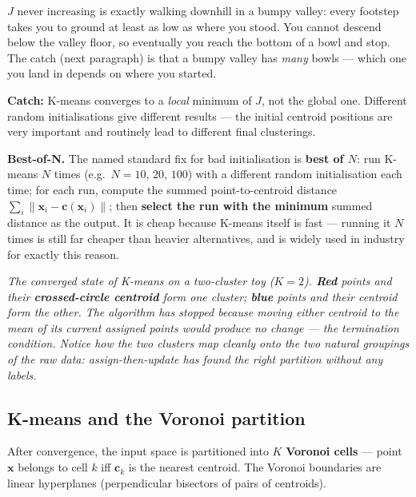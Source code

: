 \documentclass[11pt, a4paper]{article}
\begin{document}
\begin{notebox}
$J$ never increasing is exactly walking downhill in a bumpy valley: every footstep takes you to ground at least as low as where you stood. You cannot descend below the valley floor, so eventually you reach the bottom of a bowl and stop. The catch (next paragraph) is that a bumpy valley has \emph{many} bowls --- which one you land in depends on where you started.
\end{notebox}

\textbf{Catch:} K-means converges to a \emph{local} minimum of $J$, not the global one. Different random initialisations give different results — the initial centroid positions are very important and routinely lead to different final clusterings.

\textbf{Best-of-N.} The named standard fix for bad initialisation is \textbf{best of $N$}: run K-means $N$ times (e.g.\ $N = 10$, $20$, $100$) with a different random initialisation each time; for each run, compute the summed point-to-centroid distance $\sum_i \|\mathbf{x}_i - \mathbf{c}(\mathbf{x}_i)\|$; then \textbf{select the run with the minimum} summed distance as the output. It is cheap because K-means itself is fast — running it $N$ times is still far cheaper than heavier alternatives, and is widely used in industry for exactly this reason.

\begin{center}

\footnotesize\textit{The converged state of K-means on a two-cluster toy ($K=2$). \textbf{Red} points and their \textbf{crossed-circle centroid} form one cluster; \textbf{blue} points and their centroid form the other. The algorithm has stopped because moving either centroid to the mean of its current assigned points would produce no change --- the termination condition. Notice how the two clusters map cleanly onto the two natural groupings of the raw data: assign-then-update has found the right partition without any labels.}
\end{center}

\subsection{K-means and the Voronoi partition}

After convergence, the input space is partitioned into $K$ \textbf{Voronoi cells} — point $\mathbf{x}$ belongs to cell $k$ iff $\mathbf{c}_k$ is the nearest centroid. The Voronoi boundaries are linear hyperplanes (perpendicular bisectors of pairs of centroids).
\end{document}
